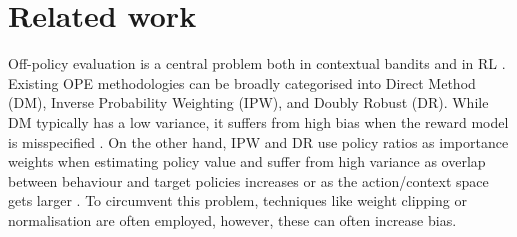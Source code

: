 \section{Related work}
Off-policy evaluation is a central problem both in contextual bandits \citep{dudik2014doubly, wang2017optimal, liu2018breaking, farajtabar2018more, su2019continuous, su2020doubly, kallus2021optimal, metelli2021subgaussian, saito2020open} and in RL \citep{thomas2016data, xie2019advances, kallus2020off, liu2020understanding}. 
Existing OPE methodologies can be broadly categorised into Direct Method (DM), Inverse Probability Weighting (IPW), and Doubly Robust (DR). 
While DM typically has a low variance, it suffers from high bias when the reward model is misspecified \citep{voloshin2021empirical}. 
On the other hand, IPW \citep{horvitz1952generalization} and DR \citep{dudik2014doubly, wang2017optimal, su2020doubly} use policy ratios as importance weights when estimating policy value and suffer from high variance as overlap between behaviour and target policies increases or as the action/context space gets larger \citep{sachdeva2020off, saito2022off}. To circumvent this problem, techniques like weight clipping or normalisation \citep{swaminathan2015counterfactual, swaminathan2015the, chaudhuri2019london} are often employed, however, these can often increase bias.





